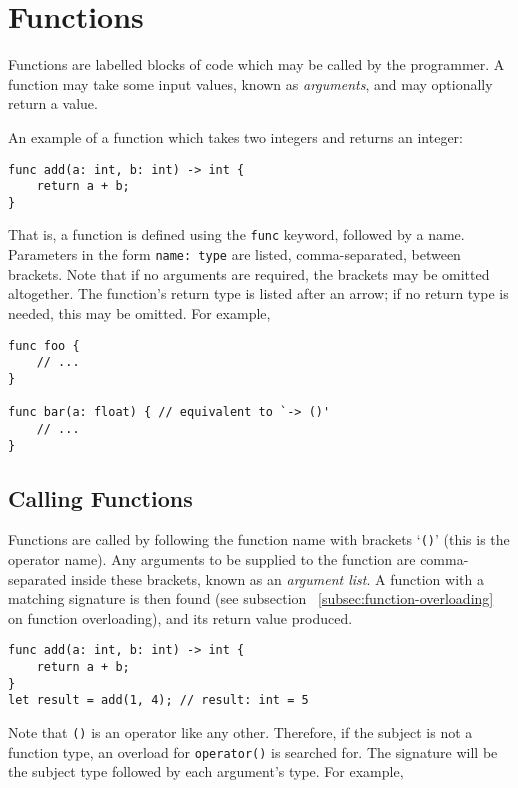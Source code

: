 \section{Functions}\label{sec:functions}

Functions are labelled blocks of code which may be called by the programmer.
A function may take some input values, known as \textit{arguments}, and may optionally return a value.

An example of a function which takes two integers and returns an integer:
\begin{lstlisting}[language=CustomLang]
func add(a: int, b: int) -> int {
    return a + b;
}
\end{lstlisting}

That is, a function is defined using the \texttt{func} keyword, followed by a name.
Parameters in the form \texttt{name: type} are listed, comma-separated, between brackets.
Note that if no arguments are required, the brackets may be omitted altogether.
The function's return type is listed after an arrow; if no return type is needed, this may be omitted.
For example,
\begin{lstlisting}[language=CustomLang]
func foo {
    // ...
}

func bar(a: float) { // equivalent to `-> ()'
    // ...
}
\end{lstlisting}

\subsection{Calling Functions}

Functions are called by following the function name with brackets `\texttt{()}' (this is the operator name).
Any arguments to be supplied to the function are comma-separated inside these brackets, known as an \textit{argument list}.
A function with a matching signature is then found (see subsection ~\ref{subsec:function-overloading} on function overloading), and its return value produced.

\begin{lstlisting}[language=CustomLang]
func add(a: int, b: int) -> int {
    return a + b;
}
let result = add(1, 4); // result: int = 5
\end{lstlisting}

Note that \texttt{()} is an operator like any other.
Therefore, if the subject is not a function type, an overload for \texttt{operator()} is searched for.
The signature will be the subject type followed by each argument's type.
For example,

